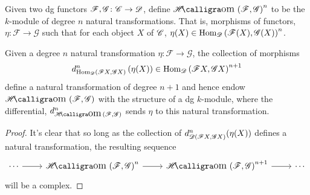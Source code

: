 \documentclass[dissertation.tex]{subfiles}
\begin{document}
\begin{defn}
  Given two dg functors $\mathscr{F},\mathscr{G} \colon \mathscr{C} \rightarrow \mathscr{D}$, define $\SHom{\mathscr{F},\mathscr{G}}^n$ to be the $k$-module of degree $n$ natural transformations.
  That is, morphisms of functors, $\eta \colon \mathscr{F} \rightarrow \mathscr{G}$ such that for each object $X$ of $\mathscr{C}$, $\eta(X) \in \operatorname{Hom}_{\mathscr{D}}\left(\mathscr{F}(X),\mathscr{G}(X)\right)^n$.
\end{defn}

\begin{prop}
  Given a degree $n$ natural transformation $\eta \colon \mathscr{F} \rightarrow \mathscr{G}$, the collection of morphisms
  $$d^n_{\operatorname{Hom}_{\mathscr{D}}\left(\mathscr{F}X, \mathscr{G}X\right)}\left( \eta(X) \right) \in \operatorname{Hom}_{\mathscr{D}}\left(\mathscr{F}X, \mathscr{G}X\right)^{n+1}$$
  define a natural transformation of degree $n + 1$ and hence endow $\SHom{\mathscr{F},\mathscr{G}}$ with the structure of a dg $k$-module, where the differential, $d_{\SHom{\mathscr{F},\mathscr{G}}}^n$ sends $\eta$ to this natural transformation.
  
  \begin{proof}
    It's clear that so long as the collection of $d^n_{\mathscr{D}(\mathscr{F} X, \mathscr{G} X)}(\eta(X))$ defines a natural transformation, the resulting sequence
    $$\begin{tikzcd}
      \cdots \arrow{r} & \SHom{\F, \G}^n \arrow{r} & \SHom{\F,\G}^{n+1} \arrow{r} & \cdots
    \end{tikzcd}$$
    will be a complex.
    

\end{proof}
\end{prop}
\end{document}

